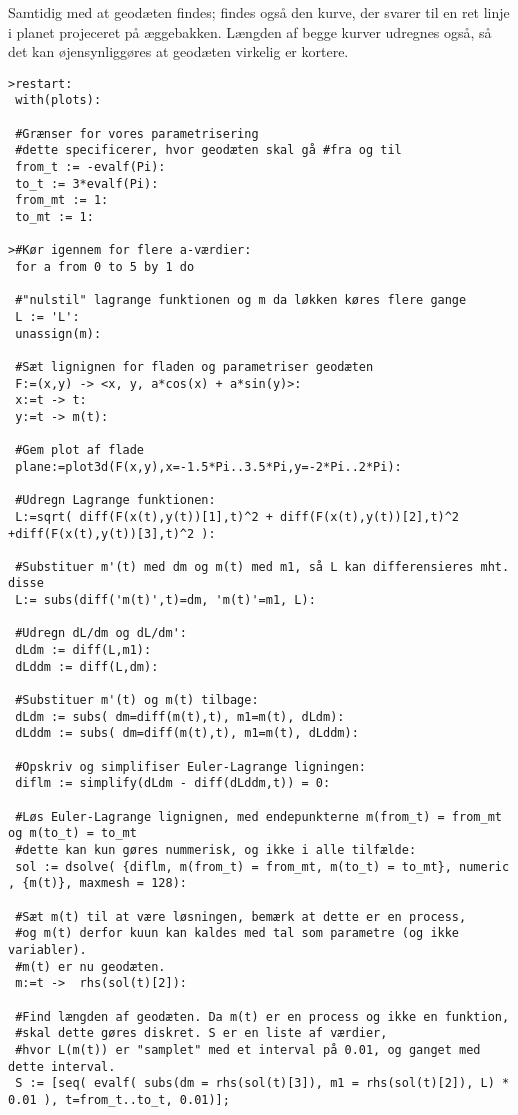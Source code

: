 Samtidig med at geodæten findes; findes også den kurve,
der svarer til en ret linje i planet projeceret på æggebakken.
Længden af begge kurver udregnes også, så det kan øjensynliggøres at geodæten virkelig er kortere.

\begin{lstlisting}[caption={\emph{Maple} kode, der gerere plots af geodæter af typen \ref{eq:aeggegeonem} på en æggebakke}]
>restart:
 with(plots):
 
 #Grænser for vores parametrisering
 #dette specificerer, hvor geodæten skal gå #fra og til
 from_t := -evalf(Pi):
 to_t := 3*evalf(Pi):
 from_mt := 1:
 to_mt := 1:
 
>#Kør igennem for flere a-værdier:
 for a from 0 to 5 by 1 do
 
 #"nulstil" lagrange funktionen og m da løkken køres flere gange
 L := 'L':
 unassign(m):
 
 #Sæt lignignen for fladen og parametriser geodæten
 F:=(x,y) -> <x, y, a*cos(x) + a*sin(y)>:
 x:=t -> t:
 y:=t -> m(t):
 
 #Gem plot af flade
 plane:=plot3d(F(x,y),x=-1.5*Pi..3.5*Pi,y=-2*Pi..2*Pi):
 
 #Udregn Lagrange funktionen:
 L:=sqrt( diff(F(x(t),y(t))[1],t)^2 + diff(F(x(t),y(t))[2],t)^2 +diff(F(x(t),y(t))[3],t)^2 ):
 
 #Substituer m'(t) med dm og m(t) med m1, så L kan differensieres mht. disse
 L:= subs(diff('m(t)',t)=dm, 'm(t)'=m1, L):
 
 #Udregn dL/dm og dL/dm':
 dLdm := diff(L,m1):
 dLddm := diff(L,dm):
 
 #Substituer m'(t) og m(t) tilbage:
 dLdm := subs( dm=diff(m(t),t), m1=m(t), dLdm):
 dLddm := subs( dm=diff(m(t),t), m1=m(t), dLddm):
 
 #Opskriv og simplifiser Euler-Lagrange ligningen:
 diflm := simplify(dLdm - diff(dLddm,t)) = 0:
 
 #Løs Euler-Lagrange lignignen, med endepunkterne m(from_t) = from_mt og m(to_t) = to_mt
 #dette kan kun gøres nummerisk, og ikke i alle tilfælde:
 sol := dsolve( {diflm, m(from_t) = from_mt, m(to_t) = to_mt}, numeric , {m(t)}, maxmesh = 128):

 #Sæt m(t) til at være løsningen, bemærk at dette er en process,
 #og m(t) derfor kuun kan kaldes med tal som parametre (og ikke variabler).
 #m(t) er nu geodæten.
 m:=t ->  rhs(sol(t)[2]):
 
 #Find længden af geodæten. Da m(t) er en process og ikke en funktion,
 #skal dette gøres diskret. S er en liste af værdier,
 #hvor L(m(t)) er "samplet" med et interval på 0.01, og ganget med dette interval.
 S := [seq( evalf( subs(dm = rhs(sol(t)[3]), m1 = rhs(sol(t)[2]), L) * 0.01 ), t=from_t..to_t, 0.01)];
 

\end{lstlisting}
